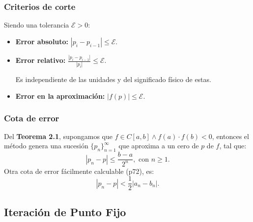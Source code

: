 \documentclass[10pt,a4paper]{article}
\begin{document}
\setlength{\columnsep}{2cm}
\begin{multicols}{2}
\subsubsection{Criterios de corte}
Siendo una tolerancia $\mathcal{E}>0$:
\begin{itemize}
\item \textbf{Error absoluto:} $|p_i - p_{i-1}| \leq \mathcal{E}$.
\item \textbf{Error relativo:} $\frac{|p_i - p_{i-1}|}{|p_i|} \leq \mathcal{E}$. 

Es independiente de las unidades y del significado físico de estas.
\item \textbf{Error en la aproximación:} $|f(p)| \leq \mathcal{E}$.
\end{itemize}
\vfill
\subsubsection{Cota de error}
Del \textbf{Teorema 2.1}, supongamos que $f \in C[a,b] \wedge f(a)\cdot f(b)<0$, entonces el método genera una sucesión $\{p_n\}_{n=1}^\infty$ que aproxima a un cero de $p$ de $f$, tal que:
\[|p_n - p| \leq \frac{b-a}{2^n}, \text{ con } n \geq 1.\]
Otra cota de error fácilmente calculable (p72), es:
\[|p_n-p| < \frac{1}{2}|a_n - b_n|.\]
\end{multicols}

\pagebreak

\subsection{Iteración de Punto Fijo}
\end{document}
